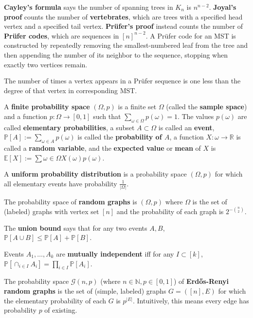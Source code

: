 \documentclass[10pt]{article}
\begin{document}
\par
\textbf{Cayley's formula} says the number of spanning trees in $K_n$ is $n^{n-2}$. \textbf{Joyal's proof} counts the number of \textbf{vertebrates}, which are trees with a specified head vertex and a specified tail vertex. \textbf{Prüfer's proof} instead counts the number of \textbf{Prüfer codes}, which are sequences in $[n]^{n-2}$. A Prüfer code for an MST is constructed by repeatedly removing the smallest-numbered leaf from the tree and then appending the number of its neighbor to the sequence, stopping when exactly two vertices remain.
\par
The number of times a vertex appears in a Prüfer sequence is one less than the degree of that vertex in corresponding MST.
\par
A \textbf{finite probability space} $(\Omega, p)$ is a finite set $\Omega$ (called the \textbf{sample space}) and a function $p: \Omega \rightarrow [0,1]$ such that $\sum_{\omega \in \Omega} p(\omega) = 1$. The values $p(\omega)$ are called \textbf{elementary probabilities}, a subset $A \subset \Omega$ is called an \textbf{event}, $\mathbb{P}[A] := \sum_{\omega \in A} p(\omega)$ is called the \textbf{probability of $A$}, a function $X: \omega \rightarrow \mathbb{R}$ is called a \textbf{random variable}, and the \textbf{expected value} or \textbf{mean} of $X$ is $\mathbb{E}[X] := \sum{\omega \in \Omega} X(\omega) p(\omega)$.
\par
A \textbf{uniform probability distribution} is a probability space $(\Omega, p)$ for which all elementary events have probability $\frac{1}{|\Omega|}$.
\par
The probability space of \textbf{random graphs} is $(\Omega, p)$ where $\Omega$ is the set of (labeled) graphs with vertex set $[n]$ and the probability of each graph is $2^{- \binom{n}{2}}$.
\par
The \textbf{union bound} says that for any two events $A, B$, $\mathbb{P}[A \cup B] \leq \mathbb{P}[A] + \mathbb{P}[B]$.
\par
Events $A_1, \dots, A_k$ are \textbf{mutually independent} iff for any $I \subset[k]$, $\mathbb{P}[\cap_{i \in I} A_i] = \prod_{i \in I} \mathbb{P}[A_i]$.
\par
The probability space $\mathcal{G}(n,p)$ (where $n \in \mathbb{N}, p \in [0,1]$) of \textbf{Erdős-Renyi random graphs} is the set of (simple, labeled) graphs $G=([n],E)$ for which the elementary probability of each $G$ is $p^{|E|}$. Intuitively, this means every edge has probability $p$ of existing.
\par
\end{document}
